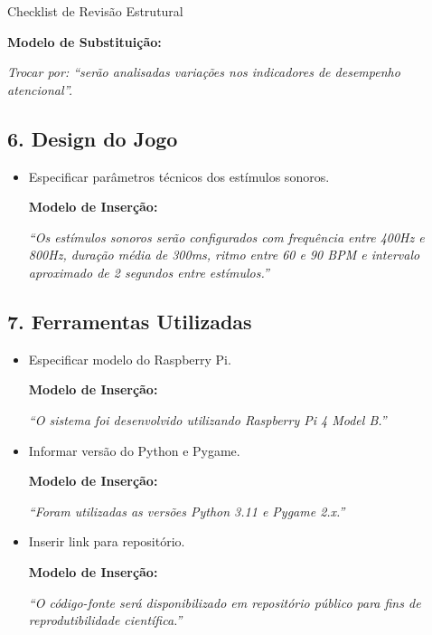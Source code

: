 \documentclass[11pt,a4paper]{article}
\begin{document}
\begin{boxAvisos}{Checklist de Revisão Estrutural}
\begin{itemize}
    \textbf{Modelo de Substituição:}
    
    \textit{Trocar por: ``serão analisadas variações nos indicadores de desempenho atencional''.}
\end{itemize}


\subsection*{6. Design do Jogo}

\begin{itemize}
    \item[$\Box$] Especificar parâmetros técnicos dos estímulos sonoros.
    
    \textbf{Modelo de Inserção:}
    
    \textit{``Os estímulos sonoros serão configurados com frequência entre 400Hz e 800Hz, duração média de 300ms, ritmo entre 60 e 90 BPM e intervalo aproximado de 2 segundos entre estímulos.''}
\end{itemize}


\subsection*{7. Ferramentas Utilizadas}

\begin{itemize}
    \item[$\Box$] Especificar modelo do Raspberry Pi.
    
    \textbf{Modelo de Inserção:}
    
    \textit{``O sistema foi desenvolvido utilizando Raspberry Pi 4 Model B.''}

    \item[$\boxtimes$] Informar versão do Python e Pygame.
    
    \textbf{Modelo de Inserção:}
    
    \textit{``Foram utilizadas as versões Python 3.11 e Pygame 2.x.''}

    \item[$\boxtimes$] Inserir link para repositório.
    
    \textbf{Modelo de Inserção:}
    
    \textit{``O código-fonte será disponibilizado em repositório público para fins de reprodutibilidade científica.''}
\end{itemize}


\end{boxAvisos}
\end{document}
